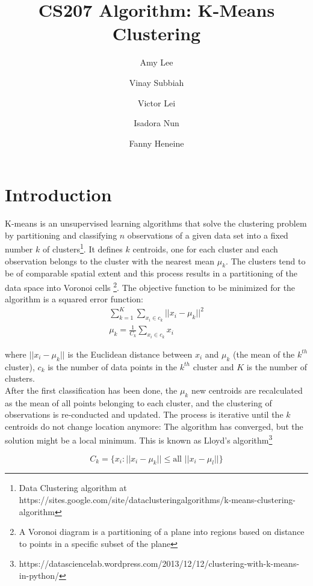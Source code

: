 \documentclass[11pt]{article}
\title{CS207 Algorithm: K-Means Clustering}
\author{Amy Lee \and Vinay Subbiah \and Victor Lei \and Isadora Nun \and Fanny Heneine}
\begin{document}
\maketitle{}

\pagestyle{plain}

\section*{Introduction}
K-means is an unsupervised learning algorithms that solve the clustering problem by partitioning and classifying $n$ observations of a given data set into a fixed number $k$ of clusters\footnote{Data Clustering algorithm at https://sites.google.com/site/dataclusteringalgorithms/k-means-clustering-algorithm}.
It defines $k$ centroids, one for each cluster and each observation belongs to the cluster with the nearest mean $\mu_k$. The clusters tend to be of comparable spatial extent and this process results in a partitioning of the data space into Voronoi cells \footnote{A Voronoi diagram is a partitioning of a plane into regions based on distance to points in a specific subset of the plane}. The objective function to be minimized for the algorithm is a squared error function:
\begin{gather}
\sum_{k=1}^{K}\sum_{x_i \in c_k}\Big|\Big|x_i-\mu_k\Big|\Big|^2 \\
\mu_k=\frac{1}{C_k}\sum_{x_i \in c_k} x_i
\end{gather}

\noindent where $\big|\big|x_i-\mu_k\big|\big|$ is the Euclidean distance between $x_i$ and $\mu_k$ (the mean of the $k^{th}$ cluster), $c_k$ is the number of data points in the $k^{th}$ cluster and $K$ is the number of clusters. \\


\noindent After the first classification has been done, the $\mu_k$ new centroids are recalculated as the mean of all points belonging to each cluster, and the clustering of observations is re-conducted and updated. The process is iterative until the $k$ centroids do not change location anymore: The algorithm has converged, but the solution might be a local minimum. This is known as Lloyd’s algorithm\footnote{https://datasciencelab.wordpress.com/2013/12/12/clustering-with-k-means-in-python/}


\begin{equation}
C_k=\{x_i: \big|\big|x_i-\mu_k\big|\big| \leq \text{all } \big|\big|x_i-\mu_l\big|\big|\}
\end{equation}
\end{document}
